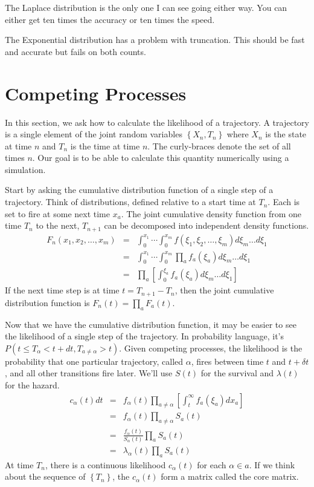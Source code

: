 \documentclass{article}
\begin{document}
The Laplace distribution is the only one I can see going either way. You can either get ten times the accuracy or ten times the speed.

The Exponential distribution has a problem with truncation. This should be fast and accurate but fails on both counts.


\section{Competing Processes}

In this section, we ask how to calculate the likelihood of a trajectory. A trajectory is a single element of the joint random variables $\left\{X_n,T_n\right\}$ where $X_n$ is the state at time $n$ and $T_n$ is the time at time $n$. The curly-braces denote the set of all times $n$. Our goal is to be able to calculate this quantity numerically using a simulation.

Start by asking the cumulative distribution function of a single step of a trajectory. Think of distributions, defined relative to a start time at $T_n$. Each is set to fire at some next time $x_a$. The joint cumulative density function from one time $T_n$ to the next, $T_{n+1}$ can be decomposed into independent density functions.
\begin{eqnarray}
	F_n(x_1, x_2,\ldots,x_m) &= &\int_0^{x_1}\cdots\int_0^{x_m}f(\xi_1,\xi_2,\ldots,\xi_m)d\xi_m\ldots d\xi_1 \\
	&= &\int_0^{x_1}\cdots\int_0^{x_m}\prod_a f_a(\xi_a)d\xi_m\ldots d\xi_1\ \\
	&= &\prod_a \left[\int_0^{\xi_a}f_a(\xi_a)d\xi_m\ldots d\xi_1\right]
\end{eqnarray}
If the next time step is at time $t=T_{n+1}-T_n$, then the joint cumulative distribution function is $F_n(t)=\prod_a F_a(t).$

Now that we have the cumulative distribution function, it may be easier to see the likelihood of a single step of the trajectory. In probability language, it's $P(t\le T_\alpha<t+dt,T_{a\ne\alpha} > t)$. Given competing processes, the likelihood is the probability that one particular trajectory, called $\alpha$, fires between time $t$ and $t+\delta t$, and all other transitions fire later. We'll use $S(t)$ for the survival and $\lambda(t)$ for the hazard.
\begin{eqnarray}
	c_{\alpha}(t)dt &=& f_{\alpha}(t)\prod_{a\ne\alpha}\left[\int_{t}^\infty f_a(\xi_a)dx_a\right] \\
	&=& f_{\alpha}(t)\prod_{a\ne\alpha}S_a(t) \\
	&=& \frac{f_{\alpha}(t)}{S_\alpha(t)}\prod_{a}S_a(t) \\
	&=& \lambda_{\alpha}(t)\prod_{a}S_a(t)\label{eqn:basic-likelihood}
\end{eqnarray}
At time $T_n$, there is a continuous likelihood $c_\alpha(t)$ for each $\alpha\in a$. If we think about the sequence of $\left\{T_n\right\}$, the $c_\alpha(t)$ form a matrix called the core matrix.
\end{document}
